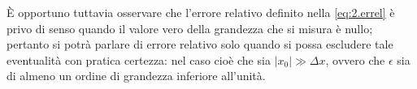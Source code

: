 \`E opportuno tuttavia osservare che l'errore relativo
definito nella \eqref{eq:2.errel} \`e privo di senso quando
il valore vero della grandezza che si misura \`e nullo;
pertanto si potr\`a parlare di errore relativo solo quando
si possa escludere tale eventualit\`a con pratica certezza:
nel caso cio\`e che sia $ \left| x_0 \right| \gg \Delta x $,
ovvero che $\epsilon$ sia di almeno un ordine di grandezza
inferiore all'unit\`a.%

\endinput
